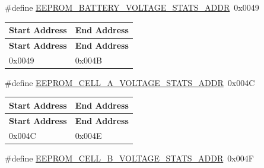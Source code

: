 \begin{DoxyCompactItemize}
\#define \hyperlink{group__defines__eeprom__address__map_ga3f624256f4e308657f4c4053c64f0feb}{E\+E\+P\+R\+O\+M\+\_\+\+B\+A\+T\+T\+E\+R\+Y\+\_\+\+V\+O\+L\+T\+A\+G\+E\+\_\+\+S\+T\+A\+T\+S\+\_\+\+A\+D\+DR}~0x0049
\begin{DoxyCompactList}\small\item\em \tabulinesep=1mm
\begin{longtabu} spread 0pt [c]{*{2}{|X[-1]}|}
\hline
\rowcolor{\tableheadbgcolor}\textbf{ Start Address}&\textbf{ End Address  }\\
\endfirsthead
\hline
\endfoot
\hline
\rowcolor{\tableheadbgcolor}\textbf{ Start Address}&\textbf{ End Address  }\\
\endhead
0x0049&0x004B \\
\end{longtabu}
\end{DoxyCompactList}\item 
\mbox{\label{group__defines__eeprom__address__map_gaa84e17318d3dbe0d8d14ce87c2157774}} 
\#define \hyperlink{group__defines__eeprom__address__map_gaa84e17318d3dbe0d8d14ce87c2157774}{E\+E\+P\+R\+O\+M\+\_\+\+C\+E\+L\+L\+\_\+\+A\+\_\+\+V\+O\+L\+T\+A\+G\+E\+\_\+\+S\+T\+A\+T\+S\+\_\+\+A\+D\+DR}~0x004C
\begin{DoxyCompactList}\small\item\em \tabulinesep=1mm
\begin{longtabu} spread 0pt [c]{*{2}{|X[-1]}|}
\hline
\rowcolor{\tableheadbgcolor}\textbf{ Start Address}&\textbf{ End Address  }\\
\endfirsthead
\hline
\endfoot
\hline
\rowcolor{\tableheadbgcolor}\textbf{ Start Address}&\textbf{ End Address  }\\
\endhead
0x004C&0x004E \\
\end{longtabu}
\end{DoxyCompactList}\item 
\mbox{\label{group__defines__eeprom__address__map_ga94346f859875a8ba8b32e579633678cc}} 
\#define \hyperlink{group__defines__eeprom__address__map_ga94346f859875a8ba8b32e579633678cc}{E\+E\+P\+R\+O\+M\+\_\+\+C\+E\+L\+L\+\_\+\+B\+\_\+\+V\+O\+L\+T\+A\+G\+E\+\_\+\+S\+T\+A\+T\+S\+\_\+\+A\+D\+DR}~0x004F
\begin{DoxyCompactList}\small\item\em \tabulinesep=1mm

\end{DoxyCompactList}
\end{DoxyCompactItemize}
